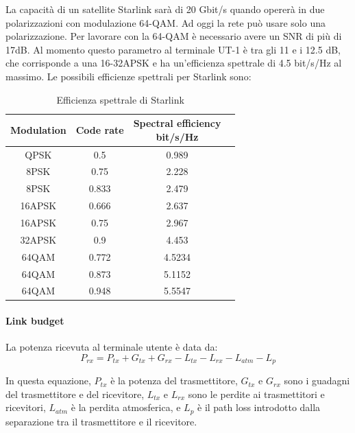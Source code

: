 %

La capacità di un satellite Starlink sarà di 20 Gbit/s quando opererà in due polarizzazioni con modulazione 64-\ac{QAM}.
Ad oggi la rete può usare solo una polarizzazione.
Per lavorare con la 64-\ac{QAM} è necessario avere un \ac{SNR} di più di 17dB.
Al momento questo parametro al terminale UT-1 è tra gli 11 e i 12.5 dB, che corrisponde a una 16-32\ac{APSK} e ha un'efficienza spettrale di 4.5 bit/s/Hz al massimo.
Le possibili efficienze spettrali per Starlink sono:

\begin{table}[h]
\centering
\begin{tabular}{|c|c|c|c|}
\hline
\textbf{Modulation} & \textbf{Code rate} & \makecell{\textbf{Spectral efficiency}\\ \textbf{bit/s/Hz}} \\ \hline
QPSK     & 0.5   & 0.989  \\ \hline
8PSK     & 0.75  & 2.228  \\ \hline
8PSK     & 0.833 & 2.479  \\ \hline
16APSK   & 0.666 & 2.637  \\ \hline
16APSK   & 0.75  & 2.967  \\ \hline
32APSK   & 0.9   & 4.453  \\ \hline
64QAM    & 0.772 & 4.5234 \\ \hline
64QAM    & 0.873 & 5.1152 \\ \hline
64QAM    & 0.948 & 5.5547 \\ \hline
\end{tabular}
\caption{Efficienza spettrale di Starlink \cite{rozenvasser_estimation_2023}}
\end{table}

\paragraph{Link budget}
La potenza ricevuta al terminale utente è data da:
\begin{equation}
P_{rx} = P_{tx} + G_{tx} + G_{rx} - L_{tx} - L_{rx} - L_{atm} - L_{p}
\label{eq:received-power}
\end{equation}

In questa equazione, $P_{tx}$ è la potenza del trasmettitore, $G_{tx}$ e $G_{rx}$ sono i guadagni del trasmettitore e del ricevitore, $L_{tx}$ e $L_{rx}$ sono le perdite ai trasmettitori e ricevitori, $L_{atm}$ è la perdita atmosferica, e $L_{p}$ è il path loss introdotto dalla separazione tra il trasmettitore e il ricevitore.

